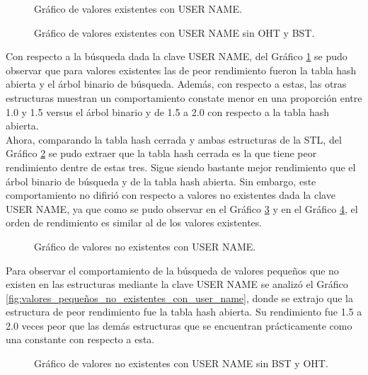 \begin{multicols}{2}
\begin{figure}[H]
    \centering
    
    \caption{Gráfico de valores existentes con USER NAME.}
    \label{fig:valores_existentes_con_user_name}
\end{figure}

\begin{figure}[H]
    \centering
    
    \caption{Gráfico de valores existentes con USER NAME sin OHT y BST.}
    \label{fig:valores_existentes_con_user_name_sin_OHT_BST}
\end{figure}
Con respecto a la búsqueda dada la clave USER NAME, del Gráfico \ref{fig:valores_existentes_con_user_name} se pudo observar que para valores existentes las de peor rendimiento fueron la tabla hash abierta y el árbol binario de búsqueda. Además, con respecto a estas, las otras estructuras muestran un comportamiento constate menor en una proporción entre 1.0 y 1.5 versus el árbol binario y de 1.5 a 2.0 con respecto a la tabla hash abierta.\\
Ahora, comparando la tabla hash cerrada y ambas estructuras de la STL, del Gráfico \ref{fig:valores_existentes_con_user_name_sin_OHT_BST} se pudo extraer que la tabla hash cerrada es la que tiene peor rendimiento dentre de estas tres. Sigue siendo bastante mejor rendimiento que el árbol binario de búsqueda y de la tabla hash abierta. Sin embargo, este comportamiento no difirió con respecto a valores no existentes dada la clave USER NAME, ya que como se pudo observar en el Gráfico \ref{fig:valores_no_existentes_con_user_name} y en el Gráfico \ref{fig:valores_no_existentes_con_user_name_sin_BST_OHT}, el orden de rendimiento es similar al de los valores existentes.

\begin{figure}[H]
    \centering
    
    \caption{Gráfico de valores no existentes con USER NAME.}
    \label{fig:valores_no_existentes_con_user_name}
\end{figure}
 Para observar el comportamiento de la búsqueda de valores pequeños que no existen en las estructuras mediante la clave USER NAME se analizó el Gráfico \ref{fig:valores_pequeños_no_existentes_con_user_name}, donde se extrajo que la estructura de peor rendimiento fue la tabla hash abierta. Su rendimiento fue 1.5 a 2.0 veces peor que las demás estructuras que se encuentran prácticamente como una constante con respecto a esta.\\
\begin{figure}[H]
    \centering
    
    \caption{Gráfico de valores no existentes con USER NAME sin BST y OHT.}
    \label{fig:valores_no_existentes_con_user_name_sin_BST_OHT}
\end{figure}


\end{multicols}
